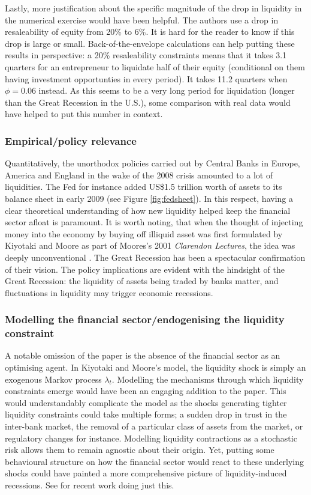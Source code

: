 \documentclass{amsart}
\theoremstyle{definition}
\theoremstyle{remark}
\numberwithin{equation}{section}
\begin{document}
Lastly, more justification about the specific magnitude of the drop in liquidity in the numerical exercise would have been helpful. The authors use a drop in resaleability of equity from 20\% to 6\%.  It is hard for the reader to know if this drop is large or small. Back-of-the-envelope calculations can help putting these results in perspective: a 20\% resaleability constraints means that it takes 3.1 quarters for an entrepreneur to liquidate half of their equity (conditional on them having investment opportunties in every period). It takes 11.2 quarters when $\phi = 0.06$ instead. As this seems to be a very long period for liquidation (longer than the Great Recession in the U.S.), some comparison with real data would have helped to put this number in context.\\

\subsubsection*{Empirical/policy relevance} Quantitatively, the unorthodox policies carried out by Central Banks in Europe, America and England in the wake of the 2008 crisis amounted to a lot of liquidities. The Fed for instance added US\$1.5 trillion worth of assets to its balance sheet in early 2009 (see Figure \ref{fig:fedsheet}). In this respect, having a clear theoretical understanding of how new liquidity helped keep the financial sector afloat is paramount. It is worth noting, that when the thought of injecting money into the economy by buying off illiquid asset was first formulated by Kiyotaki and Moore as part of Moores's 2001 \textit{Clarendon Lectures}, the idea was deeply unconventional \citep{kiyotaki2001liquidity}. The Great Recession has been a spectacular confirmation of their vision. The policy implications are evident with the hindsight of the Great Recession: the liquidity of assets being traded by banks matter, and fluctuations in liquidity may trigger economic recessions.\\

\subsubsection*{Modelling the financial sector/endogenising the liquidity constraint} A notable omission of the paper is the absence of the financial sector as an optimising agent. In Kiyotaki and Moore's model, the liquidity shock is simply an exogenous Markov process $\lambda_t$. Modelling the mechanisms through which liquidity constraints emerge would have been an engaging addition to the paper. This would understandably complicate the model as the shocks generating tighter liquidity constraints could take multiple forms; a sudden drop in trust in the inter-bank market, the removal of a particular class of assets from the market, or regulatory changes for instance. Modelling liquidity contractions as a stochastic risk allows them to remain agnostic about their origin. Yet, putting some behavioural structure on how the financial sector would react to these underlying shocks could have painted a more comprehensive picture of liquidity-induced recessions. See \cite{he2013intermediary, angeloni2013capital, gertler2010financial} for recent work doing just this.
\end{document}
